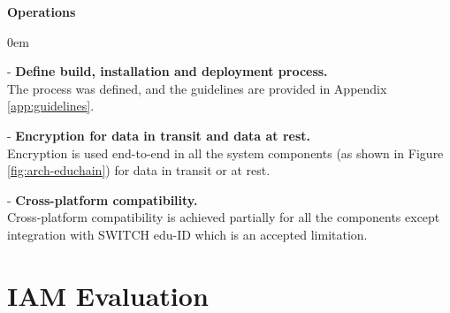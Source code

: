 \textbf{Operations}
\begin{description}[leftmargin=15pt]	
	\itemsep0em
	\item - \textbf{Define build, installation and deployment process.} \hfill \\
	The process was defined, and the guidelines are provided in Appendix \ref{app:guidelines}.
	\item - \textbf{Encryption for data in transit and data at rest.} \hfill \\
	Encryption is used end-to-end in all the system components (as shown in Figure \ref{fig:arch-educhain}) for data in transit or at rest.
	\item - \textbf{Cross-platform compatibility.} \hfill \\
	Cross-platform compatibility is achieved partially for all the components except integration with SWITCH edu-ID which is an accepted limitation. 
\end{description}


\section{IAM Evaluation} \label{sec:iam-evaluation}

